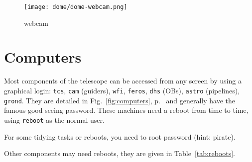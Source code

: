 \documentclass[11pt,fleqn]{book}
\def\figref#1{Fig.~\ref{fig:#1}, p.~\pageref{fig:#1}}
\begin{document}
\begin{figure}[!ht]
\centering
  \texttt{[image: dome/dome-webcam.png]}%
\caption{\gls{webcam}}
\label{fig:webcam}
\end{figure}

\section{Computers}
Most components of the telescope can be accessed from any screen by using a graphical login: \texttt{tcs}, \texttt{cam} (guiders), \texttt{wfi}, \texttt{feros}, \texttt{dhs} (OBs), \texttt{astro} (pipelines), \texttt{grond}.  They are detailed in \figref{computers} and generally have the famous good seeing password. These machines need a reboot from time to time, using \texttt{reboot} as the normal user. 

For some tidying tasks or reboots, you need to root password (hint: pirate). 

Other components may need reboots, they are given in Table~\ref{tab:reboots}. 
\end{document}
